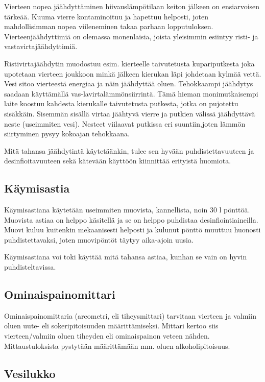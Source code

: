 \documentclass[a4paper,11pt]{report}
\begin{document}
Vierteen nopea jäähdyttäminen hiivauslämpötilaan keiton jälkeen on ensiarvoisen tärkeää. Kuuma vierre kontaminoituu ja hapettuu helposti, joten mahdollisimman nopea viileneminen takaa parhaan lopputuloksen. Vierteenjäähdyttimiä on olemassa monenlaisia, joista yleisimmin esiintyy risti- ja vastavirtajäähdyttimiä.

Ristivirtajäähdytin muodostuu esim. kierteelle taivutetusta kupariputkesta joka upotetaan vierteen joukkoon minkä jälkeen kierukan läpi johdetaan kylmää vettä. Vesi sitoo vierteestä energiaa ja näin jäähdyttää oluen. Tehokkaampi jäähdytys saadaan käyttämällä vas-lavirtalämmönsiirrintä. Tämä hieman monimutkaisempi laite koostuu kahdesta kierukalle taivutetusta putkesta, jotka on pujotettu sisäkkäin. Sisemmän sisällä virtaa jäähtyvä vierre ja putkien välissä jäähdyttävä neste (useimmiten vesi). Nesteet viilaavat putkissa eri suuntiin,joten lämmön siirtyminen pysyy kokoajan tehokkaana.

Mitä tahansa jäähdytintä käytetäänkin, tulee sen hyvään puhdistettavuuteen ja desinfioitavuuteen sekä kätevään käyttöön kiinnittää erityistä huomiota.

\subsection*{Käymisastia}

Käymisastiana käytetään useimmiten muovista, kannellista, noin 30 l pönttöä. Muovista astiaa on helppo käsitellä ja se on helppo puhdistaa desinfiointiaineilla. Muovi kuluu kuitenkin mekaanisesti helposti ja kulunut pönttö muuttuu huonosti puhdistettavaksi, joten muovipöntöt täytyy aika-ajoin uusia.

Käymisastiana voi toki käyttää mitä tahansa astiaa, kunhan se vain on hyvin puhdisteltavissa.

\subsection*{Ominaispainomittari}

Ominaispainomittaria (areometri, eli tiheysmittari) tarvitaan vierteen ja valmiin oluen uute- eli sokeripitoisuuden määrittämiseksi. Mittari kertoo siis vierteen/valmiin oluen tiheyden eli ominaispainon veteen nähden. Mittaustuloksista pystytään määrittämään mm. oluen alkoholipitoisuus.

\subsection*{Vesilukko}
\end{document}
